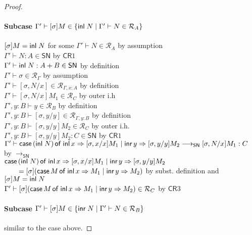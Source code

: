 \documentclass{article}
\newcommand{\SN}{\mathsf{SN}}
\newcommand{\CR}{\textsf{CR}}
\newcommand{\denot}[1]{\mathcal{R}_{#1}}
\newcommand{\inden}[3]{#1 \vdash #2 \in \denot{#3}}
\newcommand{\redSN}{\longrightarrow_\SN}
\def\lv{\mathopen{{[\kern-0.14em[}}}    %
\def\rv{\mathclose{{]\kern-0.14em]}}}   %
\newcommand{\den}[1]{\lv #1 \rv}
\begin{document}
\begin{proof}
\paragraph{Subcase $\Gamma' \vdash [\sigma]M \in \{\inl N \mid \inden{\Gamma'}{N}{A}\}$}$\;$\\[1em]
$[\sigma]M = \textsf{inl}\; N$ for some $\inden{\Gamma'}{N}{A}$ \hfill by assumption \\
$\Gamma' \vdash N : A \in \SN$ \hfill by $\CR1$ \\
$\Gamma' \vdash \inl N : A + B \in \SN$ \hfill by definition \\
$\inden{\Gamma'}{\sigma}{\Gamma}$ \hfill by assumption \\
$\inden{\Gamma'}{[\sigma, N/x]}{\Gamma, x:A}$ \hfill by definition \\
$\inden{\Gamma'}{[\sigma, N/x]M_1}{C}$ \hfill by outer i.h \\
$\inden{\Gamma', y{:}B}{y}{B}$  \hfill by definition \\
$\inden{\Gamma', y{:}B}{[\sigma, y/y]}{\Gamma, y:B}$ \hfill by definition \\
$\inden{\Gamma', y{:}B}{[\sigma, y/y]M_2}{C}$ \hfill by outer i.h. \\
$\Gamma', y{:}B \vdash [\sigma, y/y]M_2 : C \in \SN$ \hfill by $\CR1$ \\
$\Gamma' \vdash \caseof{(\inl N)}{[\sigma,x/x]M_1}{[\sigma, y/y]M_2} \redSN [\sigma, N/x]M_1 : C$ \hfill by $\redSN$\\
$\textsf{case}\,(\textsf{inl}\; N)\,\textsf{of inl}\,x \Rightarrow [\sigma,x/x]M_1 \mid \textsf{inr}\,y \Rightarrow [\sigma, y/y]M_2$ \\
$\qquad = [\sigma](\textsf{case}\,M\,\textsf{of inl}\,x \Rightarrow M_1 \mid \textsf{inr}\,y \Rightarrow M_2) $ \hfill by subst. definition and $[\sigma]M = \textsf{inl}\; N$\\
$\inden{\Gamma'}{[\sigma](\caseof{M}{M_1}{M_2})}{C}$ \hfill by $\CR3$

\paragraph{Subcase $\Gamma' \vdash [\sigma]M \in \{\inr N \mid \inden{\Gamma'}{N}{B}\}$}$\;$\\[1em]
similar to the case above.


\end{proof}
\end{document}
